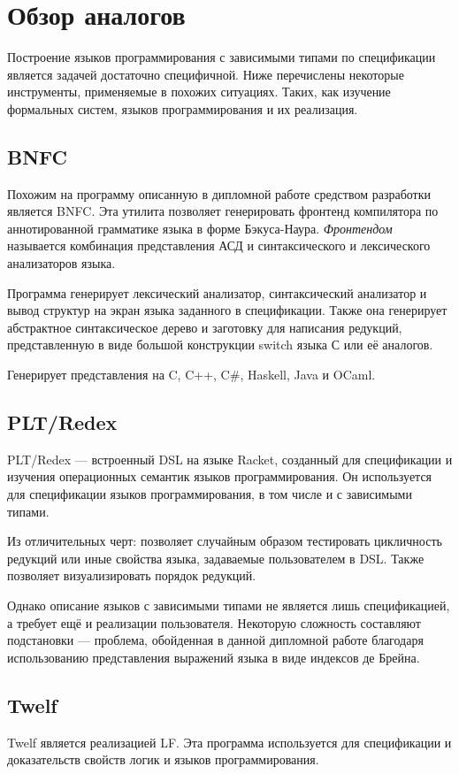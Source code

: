 \section{Обзор аналогов}
Построение языков программирования с зависимыми типами по спецификации является задачей достаточно специфичной. Ниже перечислены некоторые инструменты, применяемые в похожих ситуациях. Таких, как изучение формальных систем, языков программирования и их реализация.

\subsection{BNFC}
Похожим на программу описанную в дипломной работе средством разработки является BNFC\cite{bnfc}. Эта утилита позволяет генерировать фронтенд компилятора по аннотированной грамматике языка в форме Бэкуса-Наура\cite{lbnf}. \textit{Фронтендом} называется комбинация представления АСД и синтаксического и лексического анализаторов языка.

Программа генерирует лексический анализатор, синтаксический анализатор и вывод структур на экран языка заданного в спецификации. Также она генерирует абстрактное синтаксическое дерево и заготовку для написания редукций, представленную в виде большой конструкции switch языка С или её аналогов.

Генерирует представления на C, C++, C\#, Haskell, Java и OCaml.

\subsection{PLT/Redex}
PLT/Redex\cite{plt:redex} --- встроенный DSL на языке Racket, созданный для спецификации и изучения операционных семантик языков программирования. Он используется для спецификации языков программирования, в том числе и с зависимыми типами.

Из отличительных черт: позволяет случайным образом тестировать цикличность редукций или иные свойства языка, задаваемые пользователем в DSL. Также позволяет визуализировать порядок редукций.

Однако описание языков с зависимыми типами не является лишь спецификацией, а требует ещё и реализации пользователя\cite{plt:ex}. Некоторую сложность составляют подстановки --- проблема, обойденная в данной дипломной работе благодаря использованию представления выражений языка в виде индексов де Брейна.

\subsection{Twelf}
Twelf\cite{twelf} является реализацией LF\cite{Pfenning2002}. Эта программа используется для спецификации и доказательств свойств логик и языков программирования.

